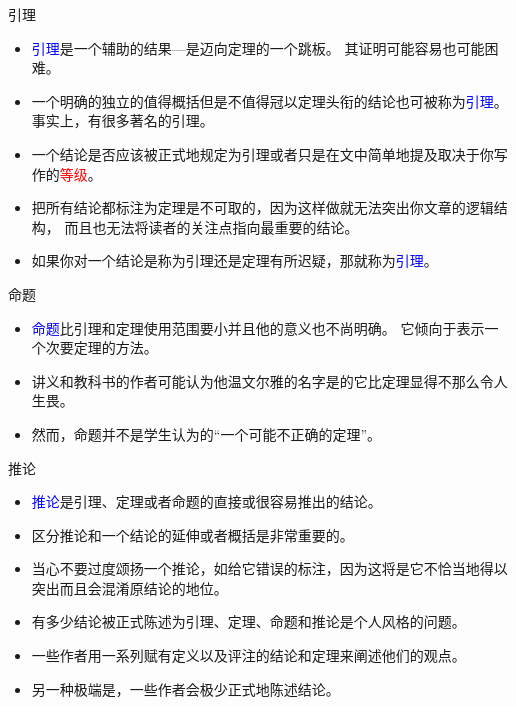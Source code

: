 \documentclass[fontset=mac]{ctexbeamer}
\newcommand{\red}[1]{\textcolor{red}{#1}}
\newcommand{\blue}[1]{\textcolor{blue}{#1}}
\begin{document}
\begin{frame}{引理}
	
\begin{itemize}
	\item 
	\blue{引理}是一个辅助的结果—是迈向定理的一个跳板。
	其证明可能容易也可能困难。
	
\item 一个明确的独立的值得概括但是不值得冠以定理头衔的结论也可被称为\blue{引理}。
事实上，有很多著名的引理。
\item 
	一个结论是否应该被正式地规定为引理或者只是在文中简单地提及取决于你写作的\red{等级}。
\item 
\alert{把所有结论都标注为定理是不可取的}，因为这样做就无法突出你文章的逻辑结构，
而且也无法将读者的关注点指向最重要的结论。
\item 如果你对一个结论是称为引理还是定理有所迟疑，那就称为\blue{引理}。
\end{itemize}
\end{frame}


\begin{frame}{命题}
\begin{itemize}
	\item 
\blue{命题}比引理和定理使用范围要小并且他的意义也不尚明确。
它倾向于表示一个次要定理的方法。
\item 讲义和教科书的作者可能认为他温文尔雅的名字是的它比定理显得不那么令人生畏。
 \item 然而，命题并不是学生认为的“一个可能不正确的定理”。
\end{itemize}
\end{frame}

\begin{frame}{推论}
\begin{itemize}
\item \blue{推论}是引理、定理或者命题的直接或很容易推出的结论。
\item 区分推论和一个结论的延伸或者概括是非常重要的。
\item 当心不要过度颂扬一个推论，如给它错误的标注，因为这将是它不恰当地得以突出而且会混淆原结论的地位。
\end{itemize}
\end{frame}

\begin{frame}
\begin{itemize}
\item 有多少结论被正式陈述为引理、定理、命题和推论是个人风格的问题。
\item 一些作者用一系列赋有定义以及评注的结论和定理来阐述他们的观点。
\item 另一种极端是，一些作者会极少正式地陈述结论。
\end{itemize}
\end{frame}
\end{document}
